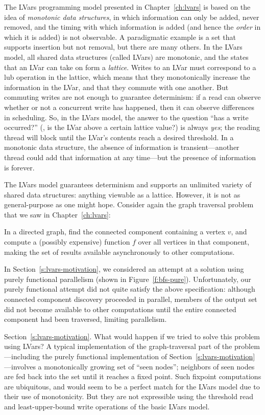 \ifdefined\DISSERTATION
The LVars programming model presented in Chapter~\ref{ch:lvars} is
based on the idea of \emph{monotonic data structures}, in which
information can only be added, never removed, and the timing with
which information is added (and hence the \emph{order} in which it is
added) is not observable.  A paradigmatic example is a set that
supports insertion but not removal, but there are many others.  In the
LVars model, all shared data structures (called LVars) are monotonic,
and the states that an LVar can take on form a \emph{lattice}.  Writes
to an LVar must correspond to a lub operation in the lattice, which
means that they monotonically increase the information in the LVar,
and that they commute with one another.  But commuting writes are not
enough to guarantee determinism: if a read can observe whether or not
a concurrent write has happened, then it can observe differences in
scheduling.  So, in the LVars model, the answer to the question ``has
a write occurred?''  (\ie, is the LVar above a certain lattice value?)
is always
\emph{yes}; the reading thread will block until the LVar's contents
reach a desired threshold.  In a monotonic data structure, the absence
of information is transient---another thread could add that
information at any time---but the presence of information is forever.
\fi

The LVars model  guarantees determinism and supports an unlimited
variety of shared data structures: anything viewable as a lattice.
However, it is not as general-purpose as one might hope.  Consider
again the graph traversal problem that we saw in 
\ifdefined\DISSERTATION
Chapter~\ref{ch:lvars}:
\begin{blockquote}
  In a directed graph, find the connected component containing a
  vertex $v$, and compute a (possibly expensive) function $f$ over all
  vertices in that component, making the set of results available
  asynchronously to other computations.
\end{blockquote}
In Section~\ref{s:lvars-motivation}, we considered an attempt at a
solution using purely functional parallelism (shown
in Figure~\ref{f:bfs-pure}).  Unfortunately, our purely functional
attempt did not quite satisfy the above specification: although
connected component discovery proceeded in parallel, members of the
output set did not become available to other computations until the
entire connected component had been traversed, limiting parallelism.

\fi
\ifdefined\JOURNAL
Section~\ref{s:lvars-motivation}.
\fi
What would happen if we tried to solve this problem using LVars?  A
typical implementation of the graph-traversal part of the
problem---including the purely functional implementation of
Section~\ref{s:lvars-motivation}---involves a monotonically growing
set of ``seen nodes''; neighbors of seen nodes are fed back into the
set until it reaches a fixed point.  Such fixpoint computations are
ubiquitous, and would seem to be a perfect match for the LVars model
due to their use of monotonicity.  But they are not expressible using
the threshold read and least-upper-bound write operations of the basic
LVars model.


